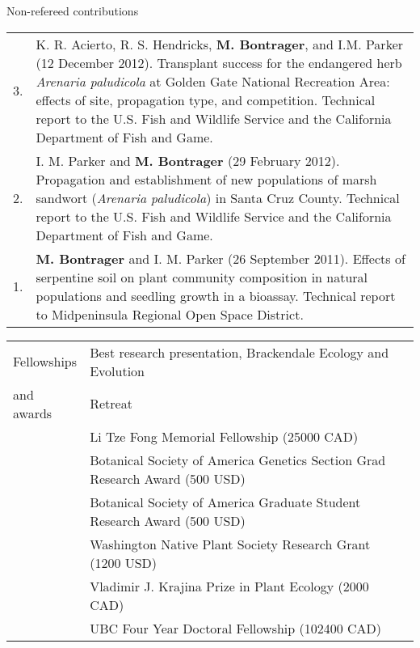 \documentclass[letterpaper,11pt,oneside]{article}
\begin{document}

\noindent\Large{Non-refereed contributions}  
\normalsize
\bigskip

\bgroup
\def\arraystretch{1.2}
\noindent \begin{tabular}{@{} p{1cm} >{\raggedright\arraybackslash}p{15.11cm}}
3. & K. R. Acierto, R. S. Hendricks, \textbf{M. Bontrager}, and I.M. Parker (12 December 2012). Transplant success for the endangered herb \textit{Arenaria paludicola} at Golden Gate National Recreation Area: effects of site, propagation type, and competition. Technical report to the U.S. Fish and Wildlife Service and the California Department of Fish and Game. \\
2. & I. M. Parker and \textbf{M. Bontrager} (29 February 2012). Propagation and establishment of new populations of marsh sandwort (\textit{Arenaria paludicola}) in Santa Cruz County. Technical report to the U.S. Fish and Wildlife Service and the California Department of Fish and Game. \\
1. & \textbf{M. Bontrager} and I. M. Parker (26 September 2011). Effects of serpentine soil on plant community composition in natural populations and seedling growth in a bioassay. Technical report to Midpeninsula Regional Open Space District. \\
\end{tabular}
\egroup
\bigskip
\bigskip






\normalsize
\noindent \begin{tabular}{@{} p{3cm} >{\raggedright\arraybackslash}p{11.71cm} >{\raggedleft\arraybackslash}p{1.2cm}}
\Large{Fellowships} & Best research presentation, Brackendale Ecology and Evolution & 2016 \\
\Large{and awards} & Retreat & \\
 & Li Tze Fong Memorial Fellowship (25000 CAD) & 2016 \\
 & Botanical Society of America Genetics Section Grad Research Award (500 USD) & 2016 \\
 & Botanical Society of America Graduate Student Research Award (500 USD) & 2016 \\
 & Washington Native Plant Society Research Grant (1200 USD) & 2016 \\
 & Vladimir J. Krajina Prize in Plant Ecology (2000 CAD) & 2013 \\
 & UBC Four Year Doctoral Fellowship (102400 CAD) & 2012 \\
\end{tabular}
\bigskip
\bigskip
 
\end{document}
